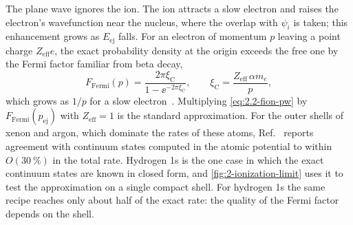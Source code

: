 The plane wave ignores the ion. The ion attracts a slow electron and raises the electron's wavefunction near the nucleus, where the overlap with $\psi_i$ is taken; this enhancement grows as $E_{\mathrm{ej}}$ falls. For an electron of momentum $p$ leaving a point charge $Z_{\mathrm{eff}}e$, the exact probability density at the origin exceeds the free one by the Fermi factor familiar from beta decay,
\begin{equation}
  F_{\mathrm{Fermi}}(p) = \frac{2\pi\xi_{\mathrm{C}}}{1 - \ee^{-2\pi\xi_{\mathrm{C}}}} , \qquad \xi_{\mathrm{C}} = \frac{Z_{\mathrm{eff}}\,\alpha m_e}{p} ,
  \label{eq:2.2-fermi}
\end{equation}
which grows as $1/p$ for a slow electron~\cite[Eq.~(1)]{essig2012direct}. Multiplying \cref{eq:2.2-fion-pw} by $F_{\mathrm{Fermi}}(p_{\mathrm{ej}})$ with $Z_{\mathrm{eff}} = 1$ is the standard approximation. For the outer shells of xenon and argon, which dominate the rates of these atoms, Ref.~\cite[text after Eq.~(6)]{essig2012direct} reports agreement with continuum states computed in the atomic potential to within $O(\SI{30}{\percent})$ in the total rate. Hydrogen 1s is the one case in which the exact continuum states are known in closed form, and \cref{fig:2-ionization-limit} uses it to test the approximation on a single compact shell. For hydrogen 1s the same recipe reaches only about half of the exact rate: the quality of the Fermi factor depends on the shell.

